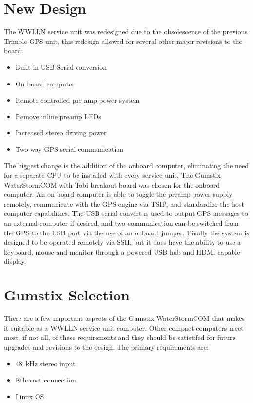 \section{New Design}

The WWLLN service unit was redesigned due to the obsolescence of the previous Trimble GPS unit, this redesign allowed for several other major revisions to the board:

\begin{itemize}
\item{Built in USB-Serial conversion}
\item{On board computer}
\item{Remote controlled pre-amp power system}
\item{Remove inline preamp LEDs}
\item{Increased stereo driving power}
\item{Two-way GPS serial communication}
\end{itemize}

The biggest change is the addition of the onboard computer, eliminating the need for a separate CPU to be installed with every service unit.
The Gumstix WaterStormCOM with Tobi breakout board was chosen for the onboard computer.
An on board computer is able to toggle the preamp power supply remotely, communicate with the GPS engine via TSIP, and standardize the host computer capabilities.
The USB-serial convert is used to output GPS messages to an external computer if desired, and two communication can be switched from the GPS to the USB port via the use of an onboard jumper.
Finally the system is designed to be operated remotely via SSH, but it does have the ability to use a keyboard, mouse and monitor through a powered USB hub and HDMI capable display.

\section{Gumstix Selection}

There are a few important aspects of the Gumstix WaterStormCOM that makes it suitable as a WWLLN service unit computer.
Other compact computers meet most, if not all, of these requirements and they should be satistifed for future upgrades and revisions to the design.
The primary requirements are:

\begin{itemize}
\item{48~kHz stereo input}
\item{Ethernet connection}
\item{Linux OS}
\end{itemize}

